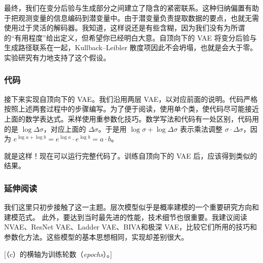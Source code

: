 最终，我们在变分后验与生成部分之间建立了隐含的紧密联系。这种归纳偏置有助于把观测变量的信息编码到潜变量中。由于潜变量负责提取数据的要点，也就无需使用过于灵活的解码器。我知道，这样说还是有些含糊，因为我们没有为所谓的“有用程度”给出定义，但希望你已经明白大意。自顶向下的 VAE 将变分后验与生成路径联系在一起，Kullback–Leibler 散度项因此不会坍塌，也就是会大于零。实验研究有力地支持了这个假设。

\subsubsection{代码}
接下来实现自顶向下的 VAE。我们沿用两层 VAE，以对应前面的说明。代码严格按照上述两套过程中的步骤编写。为了便于阅读，使用单个类，使代码尽可能接近上面的数学表达式。采样使用重参数化技巧。数学写法和代码有一处区别，代码用的是 $\log\Delta\sigma$，对应上面的 $\Delta\sigma$。于是用 $\log\sigma+\log\Delta\sigma$ 表示乘法调整 $\sigma\cdot\Delta\sigma$，因为 $e^{\log a+\log b}=e^{\log a}\cdot e^{\log b}=a\cdot b$。


就是这样！现在可以运行完整代码了。训练自顶向下的 VAE 后，应该得到类似的结果。

\subsubsection{延伸阅读}
我们这里只初步接触了这一主题。层次模型似乎是概率建模的一个重要研究方向和建模范式。
此外，要达到当时最先进的性能，技术细节也很重要。我建议阅读 NVAE、ResNet VAE、Ladder VAE、BIVA和极深 VAE，比较它们所用的技巧和参数化方法。这些模型的基本思想相同，实现却差别很大。

[（c）的横轴为训练轮数（\textit{epochs}）。]


